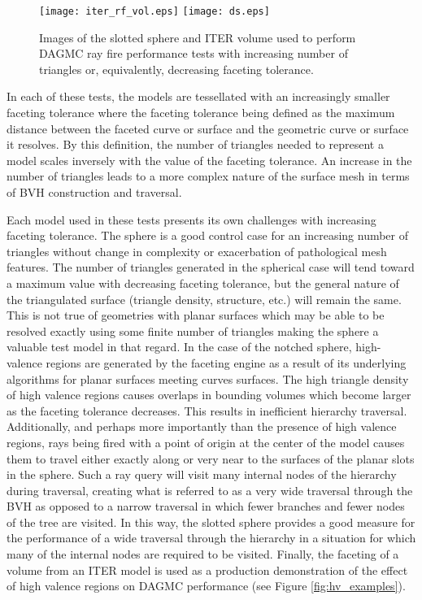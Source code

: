\begin{figure}[H]
  \centering
    \texttt{[image: iter\_rf\_vol.eps]}
    \texttt{[image: ds.eps]}
  \caption{Images of the slotted sphere and ITER volume used to perform DAGMC
    ray fire performance tests with increasing number of triangles or,
    equivalently, decreasing faceting tolerance.}
  \label{fig:sj_hv_test_models}
\end{figure} 

In each of these tests, the models are tessellated with an increasingly smaller
faceting tolerance where the faceting tolerance being defined as the maximum
distance between the faceted curve or surface and the geometric curve or surface
it resolves. By this definition, the number of triangles needed to represent a
model scales inversely with the value of the faceting tolerance. An increase in
the number of triangles leads to a more complex nature of the surface mesh in
terms of BVH construction and traversal.

Each model used in these tests presents its own challenges with increasing
faceting tolerance. The sphere is a good control case for an increasing number
of triangles without change in complexity or exacerbation of pathological mesh
features. The number of triangles generated in the spherical case will tend
toward a maximum value with decreasing faceting tolerance, but the general
nature of the triangulated surface (triangle density, structure, etc.)  will
remain the same. This is not true of geometries with planar surfaces which may
be able to be resolved exactly using some finite number of triangles making the
sphere a valuable test model in that regard. In the case of the notched sphere,
high-valence regions are generated by the faceting engine as a result of its
underlying algorithms for planar surfaces meeting curves surfaces. The high
triangle density of high valence regions causes overlaps in bounding volumes
which become larger as the faceting tolerance decreases. This results in
inefficient hierarchy traversal. Additionally, and perhaps more importantly than
the presence of high valence regions, rays being fired with a point of origin at
the center of the model causes them to travel either exactly along or very near
to the surfaces of the planar slots in the sphere. Such a ray query will visit
many internal nodes of the hierarchy during traversal, creating what is referred
to as a very wide traversal through the BVH as opposed to a narrow traversal in
which fewer branches and fewer nodes of the tree are visited. In this way, the
slotted sphere provides a good measure for the performance of a wide traversal
through the hierarchy in a situation for which many of the internal nodes are
required to be visited. Finally, the faceting of a volume from an ITER model is
used as a production demonstration of the effect of high valence regions on
DAGMC performance (see Figure \ref{fig:hv_examples}).

